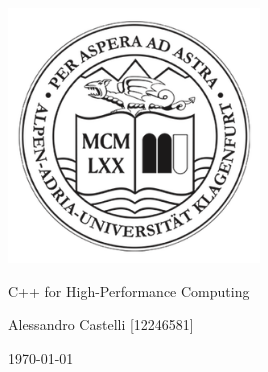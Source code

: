 \documentclass[11pt]{article}
\begin{document}
\begin{titlepage}
    \centering
    \includegraphics[width=0.5\textwidth]{aau.png}
    \vfill
    \begin{center}
        {\LARGE C++ for High-Performance Computing \par}
        \vspace{0.5cm}
        {\large Alessandro Castelli [12246581] \par}
        \vspace{0.5cm}
        {\large \today \par}
    \end{center}
    \vfill
\end{titlepage}
\end{document}

